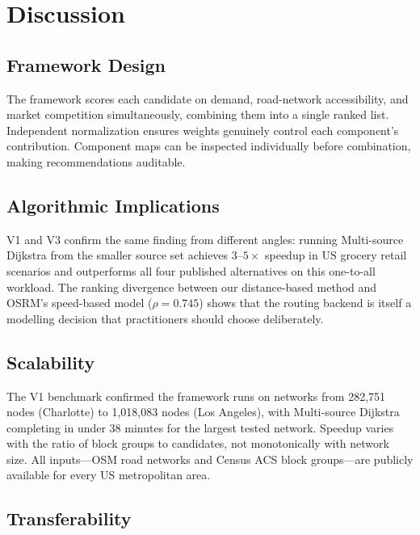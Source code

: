 \documentclass[conference]{IEEEtran}
\begin{document}
\section{Discussion}
\label{sec:discussion}

\subsection{Framework Design}

The framework scores each candidate on demand, road-network accessibility, and market competition simultaneously, combining them into a single ranked list.  Independent normalization ensures weights genuinely control each component's contribution.  Component maps can be inspected individually before combination, making recommendations auditable.

\subsection{Algorithmic Implications}

V1 and V3 confirm the same finding from different angles: running Multi-source Dijkstra from the smaller source set achieves $3$--$5\times$ speedup in US grocery retail scenarios and outperforms all four published alternatives on this one-to-all workload.  The ranking divergence between our distance-based method and OSRM's speed-based model ($\rho = 0.745$) shows that the routing backend is itself a modelling decision that practitioners should choose deliberately.

\subsection{Scalability}

The V1 benchmark confirmed the framework runs on networks from 282{,}751 nodes (Charlotte) to 1{,}018{,}083 nodes (Los Angeles), with Multi-source Dijkstra completing in under 38 minutes for the largest tested network.  Speedup varies with the ratio of block groups to candidates, not monotonically with network size.  All inputs---OSM road networks and Census ACS block groups---are publicly available for every US metropolitan area.

\subsection{Transferability}
\end{document}
